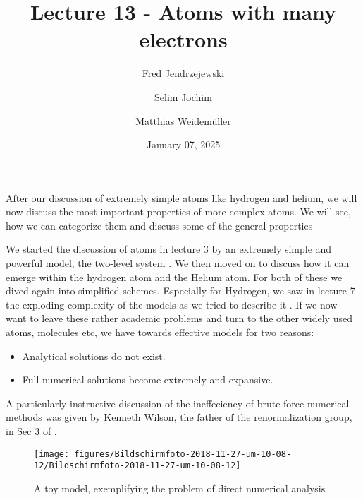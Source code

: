 \documentclass[10pt]{article}
\let\cite\citep
\renewenvironment{abstract}
  {{\bfseries\noindent{\abstractname}\par\nobreak}\footnotesize}
  {\bigskip}
\providecommand\citep{\cite}
\begin{document}
\title{Lecture 13  - Atoms with many electrons}



\author[1]{Fred Jendrzejewski}%
\author[2]{Selim Jochim}%
\author[2]{Matthias Weidemüller}%
%
%


\vspace{-1em}



  
  \date{January 07, 2025}


\begingroup
\let\center\flushleft
\let\endcenter\endflushleft
\maketitle
\endgroup





\begin{abstract}
After our discussion of extremely simple atoms like hydrogen and helium, we will now discuss the most important properties of more complex atoms. We will see, how we can categorize them and discuss some of the general properties%
\end{abstract}%



\sloppy


We started the discussion of atoms in lecture 3 by an extremely simple and powerful model, the two-level system \cite{Jendrzejewski}. We then moved on to discuss how it can emerge within the hydrogen atom and the Helium atom. For both of these we dived again into simplified schemes. Especially for Hydrogen, we saw in lecture 7 the exploding complexity of the models as we tried to describe it \cite{Jendrzejewskia}. If we now want to leave these rather academic problems and turn to the other widely used atoms, molecules etc, we have towards effective models for two reasons:
\begin{itemize}
\item Analytical solutions do not exist.
\item Full numerical solutions become extremely and expansive.
\end{itemize}

A particularly instructive discussion of the ineffeciency of brute force numerical methods was given by Kenneth Wilson, the father of the renormalization group, in Sec 3 of \cite{Wilson_1975}.
\begin{figure}[h!]
\begin{center}
\texttt{[image: figures/Bildschirmfoto-2018-11-27-um-10-08-12/Bildschirmfoto-2018-11-27-um-10-08-12]}
\caption{{A toy model, exemplifying the problem of direct numerical analysis
{\label{475459}}%
}}
\end{center}
\end{figure}
\end{document}
